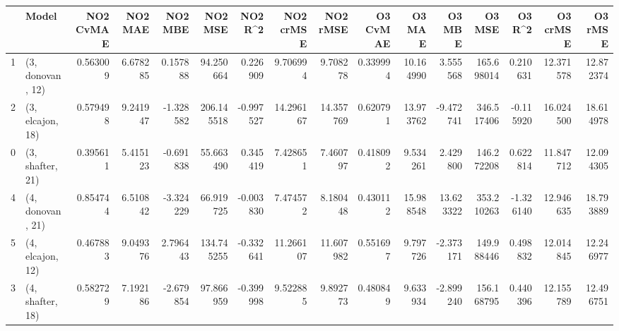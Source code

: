 \begin{tabular}{llrrrrrrrrrrrrrr}
\toprule
{} &             Model &  NO2 CvMAE &   NO2 MAE &   NO2 MBE &     NO2 MSE &   NO2 R\textasciicircum2 &  NO2 crMSE &   NO2 rMSE &  O3 CvMAE &     O3 MAE &     O3 MBE &      O3 MSE &    O3 R\textasciicircum2 &   O3 crMSE &    O3 rMSE \\
\midrule
1 &  (3, donovan, 12) &   0.563009 &  6.678285 &  0.157888 &   94.250664 &  0.226909 &   9.706994 &   9.708278 &  0.339994 &  10.164990 &   3.555568 &  165.698014 &  0.210631 &  12.371578 &  12.872374 \\
2 &  (3, elcajon, 18) &   0.579498 &  9.241947 & -1.328582 &  206.145518 & -0.997527 &  14.296167 &  14.357769 &  0.620791 &  13.973762 &  -9.472741 &  346.517406 & -0.115920 &  16.024500 &  18.614978 \\
0 &  (3, shafter, 21) &   0.395611 &  5.415123 & -0.691838 &   55.663490 &  0.345419 &   7.428651 &   7.460797 &  0.418092 &   9.534261 &   2.429800 &  146.272208 &  0.622814 &  11.847712 &  12.094305 \\
4 &  (4, donovan, 21) &   0.854744 &  6.510842 & -3.324229 &   66.919725 & -0.003830 &   7.474572 &   8.180448 &  0.430112 &  15.988548 &  13.623322 &  353.210263 & -1.326140 &  12.946635 &  18.793889 \\
5 &  (4, elcajon, 12) &   0.467883 &  9.049376 &  2.796443 &  134.745255 & -0.332641 &  11.266107 &  11.607982 &  0.551697 &   9.797726 &  -2.373171 &  149.988446 &  0.498832 &  12.014845 &  12.246977 \\
3 &  (4, shafter, 18) &   0.582729 &  7.192186 & -2.679854 &   97.866959 & -0.399998 &   9.522885 &   9.892773 &  0.480849 &   9.633934 &  -2.899240 &  156.168795 &  0.440396 &  12.155789 &  12.496751 \\
\bottomrule
\end{tabular}
